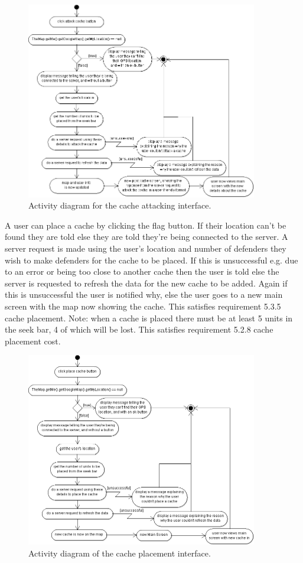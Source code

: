 \newpage
\begin{figure}
    \centering
    \includegraphics[width=0.9\textwidth]{images/activity/attackCache}
    \caption{Activity diagram for the cache attacking interface.}
\end{figure}

A user can place a cache by clicking the flag button. If their location can't be found they are told else they are told they're being connected to the server. A server request is made using the user's location and number of defenders they wish to make defenders for the cache to be placed. If this is unsuccessful e.g. due to an error or being too close to another cache then the user is told else the server is requested to refresh the data for the new cache to be added. Again if this is unsuccessful the user is notified why, else the user goes to a new main screen with the map now showing the cache. This satisfies requirement 5.3.5 cache placement. Note: when a cache is placed there must be at least 5 units in the seek bar, 4 of which will be lost. This satisfies requirement 5.2.8 cache placement cost.

\newpage
\begin{figure}
    \centering
    \includegraphics[width=0.9\textwidth]{images/activity/placeCache}
    \caption{Activity diagram of the cache placement interface.}
\end{figure}

